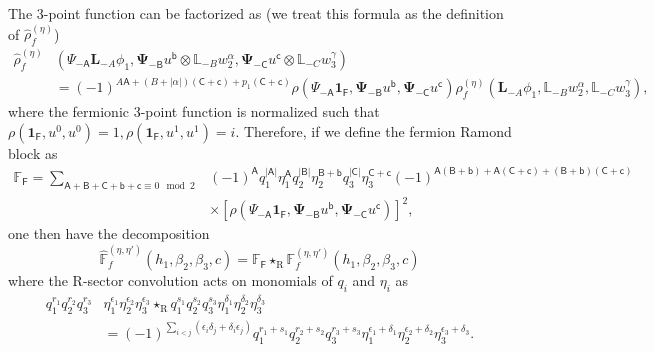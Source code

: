 \documentclass[12pt]{article}
\newcommand{\ie}{\begin{equation}\begin{aligned}}
\newcommand{\fe}{\end{aligned}\end{equation}}
\numberwithin{equation}{section}
\newcommand{\R}{\mathrm{R}}
\begin{document}
The 3-point function can be factorized as (we treat this formula as the definition of $\hat{\rho}^{(\eta)}_f$)
\ie
\hat{\rho}_f^{(\eta)}&(\Psi_{-\mathsf{A}}\mathbf{L}_{-A}\phi_1, \boldsymbol\Psi_{-\mathsf{B}}u^{\mathsf{b}}\otimes \mathbb{L}_{-B}w^\alpha_2, \boldsymbol\Psi_{-\mathsf{C}}u^{\mathsf{c}}\otimes \mathbb{L}_{-C}w^\gamma_3)\\
&=(-1)^{A\mathsf{A}+(B+|\alpha|)(\mathsf{C+c})+p_1(\mathsf{C+c})}\rho(\Psi_{-\mathsf{A}}\mathbf{1}_{\mathsf{F}}, \boldsymbol\Psi_{-\mathsf{B}}u^{\mathsf{b}},\boldsymbol\Psi_{-\mathsf{C}}u^{\mathsf{c}}) {\rho}_f^{(\eta)}(\mathbf{L}_{-A}\phi_1, \mathbb{L}_{-B}w^\alpha_2, \mathbb{L}_{-C}w^\gamma_3),
\fe
where the fermionic 3-point function is normalized such that $\rho(\mathbf{1}_{\mathsf{F}}, u^0, u^0)=1,\rho(\mathbf{1}_{\mathsf{F}}, u^1, u^1)=i$. Therefore, if we define the fermion Ramond block as
\ie
\mathbb{F}_{\mathsf{F}} = \sum_{\mathsf{A+B+C+b+c}\equiv 0 \mod 2} &(-1)^{\mathsf{A}}q_1^{|\mathsf{A}|} \eta_1^{\mathsf{A}} q_2^{|\mathsf{B}|} \eta_2^{\mathsf{B}+\mathsf{b}} q_3^{|\mathsf{C}|} \eta_3^{\mathsf{C}+\mathsf{c}} (-1)^{\mathsf{A(B+b)+A(C+c)+(B+b)(C+c)}}\\
& \times [\rho(\Psi_{-\mathsf{A}}\mathbf{1}_{\mathsf{F}}, \boldsymbol\Psi_{-\mathsf{B}}u^{\mathsf{b}},\boldsymbol\Psi_{-\mathsf{C}}u^{\mathsf{c}})]^2,
\fe
one then have the decomposition
\[\widehat{\mathbb{F}}_f^{(\eta, \eta')}(h_1, \beta_2, \beta_3, c) = \mathbb{F}_{\mathsf{F}}\star_{\R}\mathbb{F}_f^{(\eta, \eta')}(h_1, \beta_2, \beta_3, c)\]
where the R-sector convolution acts on monomials of $q_i$ and $\eta_i$ as
\ie
q_1^{r_1}q_2^{r_2}q_3^{r_3}&\eta_1^{\epsilon_1}\eta_2^{\epsilon_2}\eta_3^{\epsilon_3} \star_{\R} q_1^{s_1}q_2^{s_2}q_3^{s_3}\eta_1^{\delta_1}\eta_2^{\delta_2}\eta_3^{\delta_3}\\
&=(-1)^{\sum_{i<j} (\epsilon_i \delta_j + \delta_i \epsilon_j)}q_1^{r_1+s_1}q_2^{r_2+s_2}q_3^{r_3+s_3}\eta_1^{\epsilon_1+\delta_1}\eta_2^{\epsilon_2+\delta_2}\eta_3^{\epsilon_3+\delta_3}.
\fe
\end{document}
